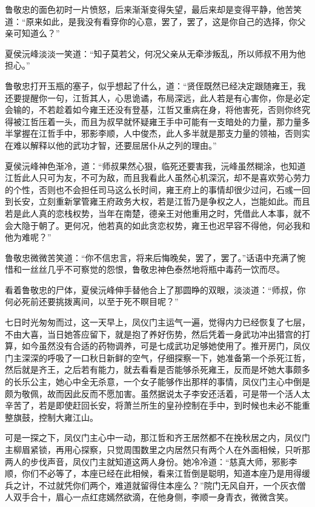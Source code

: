 鲁敬忠的面色初时一片愤怒，后来渐渐变得失望，最后来却是变得平静，他苦笑道：“原来如此，是我没有看穿你的心意，罢了，罢了，这是你自己的选择，你父亲可知道么？”

夏侯沅峰淡淡一笑道：“知子莫若父，何况父亲从无牵涉叛乱，所以师叔不用为他担心。”

鲁敬忠打开玉瓶的塞子，似乎想起了什么，道：“贤侄既然已经决定跟随雍王，我还要提醒你一句，江哲其人，心思诡谲，布局深远，此人若是有心害你，你是必定会输的，不若趁着如今雍王还没有登基，江哲又重病在身，将他害死，否则你终究得被江哲压着一头，而且为叔早就怀疑雍王手中可能有一支暗处的力量，那力量多半掌握在江哲手中，邪影李顺，人中俊杰，此人多半就是那支力量的领袖，否则实在难以解释以他的武功才智，还要屈居仆从之列的理由。”

夏侯沅峰神色渐冷，道：“师叔果然心狠，临死还要害我，沅峰虽然糊涂，也知道江哲此人只可为友，不可为敌，而且我看此人虽然心机深沉，却不是喜欢劳心劳力的个性，否则也不会担任司马这么长时间，雍王府上的事情却很少过问，石彧一回到长安，立刻重新掌管雍王府政务大权，若是江哲乃是争权之人，岂能如此。而且若是此人真的恋栈权势，当年在南楚，德亲王对他重用之时，凭借此人本事，就不会大隐于朝了。更何况，他若真的如此贪恋权势，雍王也迟早容不得他，何必我和他为难呢？”

鲁敬忠微微苦笑道：“你不信忠言，将来后悔晚矣，罢了，罢了。”话语中充满了惋惜和一丝丝几乎不可察觉的怨恨，鲁敬忠神色泰然地将瓶中毒药一饮而尽。

看着鲁敬忠的尸体，夏侯沅峰伸手替他合上了那圆睁的双眼，淡淡道：“师叔，你何必死前还要挑拨离间，以至于死不瞑目呢？”

七日时光匆匆而过，这一天早上，凤仪门主运气一遍，觉得内力已经恢复了七层，不由大喜，当日她答应留下，就是抱了养好伤势，然后凭着一身武功冲出猎宫的打算，如今虽然没有合适的药物调养，可是七成武功足够她使用了。推开房门，凤仪门主深深的呼吸了一口秋日新鲜的空气，仔细探察一下，她准备第一个杀死江哲，然后就是齐王，之后若有能力，就去看看是否能够杀死雍王，反而是坏她大事颇多的长乐公主，她心中全无杀意，一个女子能够作出那样的事情，凤仪门主心中倒是颇为敬佩，故而因此反而不愿加害。虽然据说太子李安还活着，可是带一个活人太辛苦了，若是即使赶回长安，将萧兰所生的皇孙控制在手中，到时候也未必不能重整旗鼓，控制大雍江山。

可是一探之下，凤仪门主心中一动，那江哲和齐王居然都不在挽秋居之内，凤仪门主柳眉紧锁，再用心探察，只觉周围数里之内居然只有两个人在外面相候，只听那两人的步伐声音，凤仪门主就知道这两人身份。她冷冷道：“慈真大师，邪影李顺，你们不必等了，本座已经在此相候，看来江哲倒是聪明，知道本座乃是用得缓兵之计，不过就凭你们两个，难道就留得住本座么？”院门无风自开，一个灰衣僧人双手合十，眉心一点红痣嫣然欲滴，在他身侧，李顺一身青衣，微微含笑。

